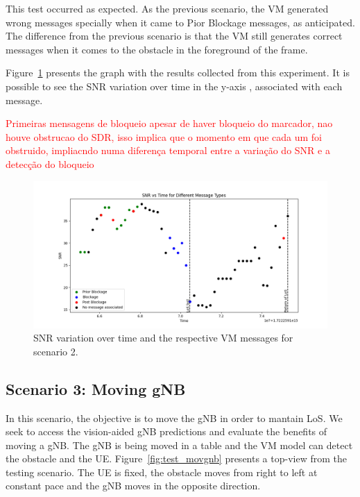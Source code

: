 This test occurred as expected.
As the previous scenario, the VM generated wrong messages specially when it came to Pior Blockage messages, as anticipated.
The difference from the previous scenario is that the VM still generates correct messages when it comes to the obstacle in the foreground of the frame.


Figure~\ref{fig:results_2} presents the graph with the results collected from this experiment.
It is possible to see the SNR variation over time in the y-axis , associated with each message.

\textcolor{red}{Primeiras mensagens de bloqueio apesar de haver bloqueio do marcador, nao houve obstrucao do SDR, isso implica que o momento em que cada um foi obstruido, impliacndo numa diferença temporal entre a variação do SNR e a detecção do bloqueio}


\begin{figure}[H]
    \centering
    \includegraphics[width=\linewidth]{figures/results_2}
    \caption{SNR variation over time and the respective VM messages for scenario 2.}
    \label{fig:results_2}
\end{figure}

\subsection{Scenario 3: Moving gNB}\label{subsec:scenario-3:-moving-gnb}

In this scenario, the objective is to move the gNB in order to mantain LoS\@.
We seek to access the vision-aided gNB predictions and evaluate the benefits of moving a gNB\@.
The gNB is being moved in a table and the VM model can detect the obstacle and the UE\@.
Figure~\ref{fig:test_movgnb} presents a top-view from the testing scenario.
The UE  is fixed, the obstacle moves from right to left at constant pace and the gNB moves in the opposite direction.

